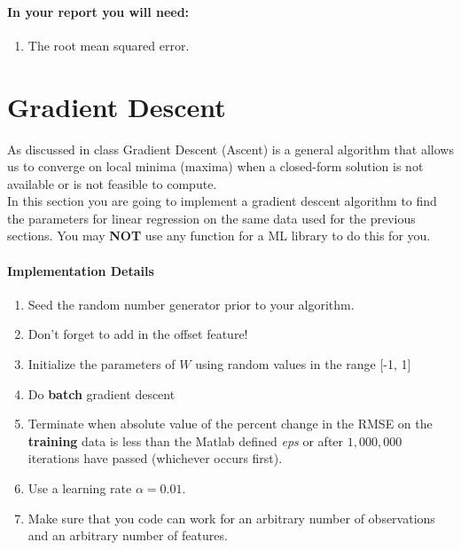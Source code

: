 \documentclass[12pt]{article}
\begin{document}
\paragraph{In your report you will need:}
\begin{enumerate}
\item The root mean squared error.
\end{enumerate}


\newpage
\section{Gradient Descent}
As discussed in class Gradient Descent (Ascent) is a general algorithm that allows us to converge on local minima (maxima) when a closed-form solution is not available or is not feasible to compute.\\

\noindent
In this section you are going to implement a gradient descent algorithm to find the parameters for linear regression on the same data used for the previous sections.  You may \textbf{NOT} use any function for a ML library to do this for you.

\paragraph{Implementation Details}
\begin{enumerate}
\item Seed the random number generator prior to your algorithm.
\item Don't forget to add in the offset feature!
\item Initialize the parameters of $W$ using random values in the range [-1, 1]
\item Do \textbf{batch} gradient descent
\item Terminate when absolute value of the percent change in the RMSE on the \textbf{training} data is less than the Matlab defined \emph{eps} or after $1,000,000$ iterations have passed (whichever occurs first).
\item Use a learning rate $\alpha=0.01$.
\item Make sure that you code can work for an arbitrary number of observations and an arbitrary number of features.
\end{enumerate}
\end{document}
